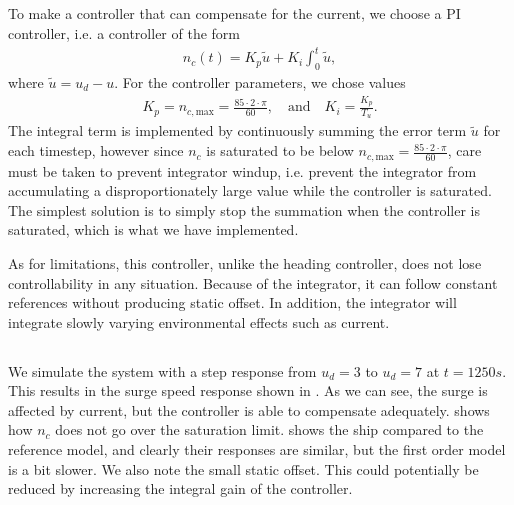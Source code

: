 \subsection{}
To make a controller that can compensate for the current, we choose a PI controller, i.e. a controller of the form
\begin{equation}\begin{aligned}
n_c(t) = K_p \tilde u + K_i \int^{t}_{0} \tilde u,
\end{aligned}\end{equation}
where $\tilde u = u_d - u$.
For the controller parameters, we chose values
\begin{equation}\begin{aligned}
K_p = n_{c, \text{max}} = \frac{85 \cdot 2 \cdot \pi}{60}, \quad \text{and} \quad K_i = \frac{K_p}{T_u}.
\end{aligned}\end{equation}
The integral term is implemented by continuously summing the error term $\tilde u$ for each timestep, however since $n_c$ is saturated to be below $n_{c, \text{max}} = \frac{85 \cdot 2 \cdot \pi}{60}$, care must be taken to prevent integrator windup, i.e. prevent the integrator from accumulating a disproportionately large value while the controller is saturated. The simplest solution is to simply stop the summation when the controller is saturated, which is what we have implemented.

As for limitations, this controller, unlike the heading controller, does not lose controllability in any situation. Because of the integrator, it can follow constant references without producing static offset. In addition, the integrator will integrate slowly varying environmental effects such as current.


\subsection{}
We simulate the system with a step response from $u_d = 3$ to $u_d = 7$ at $t=1250s$. This results in the surge speed response shown in . As we can see, the surge is affected by current, but the controller is able to compensate adequately.  shows how $n_c$ does not go over the saturation limit.  shows the ship compared to the reference model, and clearly their responses are similar, but the first order model is a bit slower. We also note the small static offset. This could potentially be reduced by increasing the integral gain of the controller.

